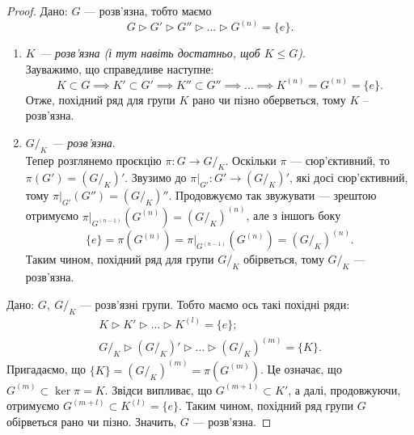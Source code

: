 \documentclass{math_library}
\begin{document}
\begin{proof}
\rightproof Дано: $G$ --- розв'язна, тобто маємо
\[
G \triangleright G' \triangleright G'' \triangleright \dots \triangleright G^{(n)} = \{e\}.
\]
\begin{enumerate}[wide=0pt,label={\Roman*.}]
\item \textit{$K$ --- розв'язна (і тут навіть достатньо, щоб $K \leq G$)}.\\
Зауважимо, що справедливе наступне:
\[
K \subset G \implies K' \subset G' \implies K'' \subset G'' \implies \dots \implies K^{(n)} = G^{(n)} = \{e\}.
\]
Отже, похідний ряд для групи $K$ рано чи пізно оберветься, тому $K$ -- розв'язна.

\item \textit{$G/_K$ --- розв'язна}.\\
Тепер розглянемо проєкцію $\pi \colon G \to G/_K$. Оскільки $\pi$ --- сюр'єктивний, то $\pi(G') = (G/_K)'$. Звузимо до $\pi|_{G'} \colon G' \to (G/_K)'$, які досі сюр'єктивний, тому $\pi|_{G'}(G'') = (G/_K)''$. Продовжуємо так звужувати --- зрештою отримуємо $\pi|_{G^{(n-1)}}(G^{(n)}) = (G/_K)^{(n)}$, але з іншогь боку
\[ 
\{e\} = \pi(G^{(n)}) = \pi|_{G^{(n-1)}}(G^{(n)}) = (G/_K)^{(n)}.
\] 
Таким чином, похідний ряд для групи $G/_K$ обірветься, тому $G/_K$ --- розв'язна.
\end{enumerate}

\leftproof Дано: $G,\ G/_K$ --- розв'язні групи. Тобто маємо ось такі похідні ряди:
\begin{align*}
K \triangleright K' \triangleright \dots \triangleright K^{(l)} = \{e\};\\
G/_K \triangleright (G/_K)' \triangleright \dots \triangleright (G/_K)^{(m)} = \{K\}.
\end{align*}
Пригадаємо, що $\{K\} = (G/_K)^{(m)} = \pi(G^{(m)})$. Це означає, що $G^{(m)} \subset \ker \pi = K$. Звідси випливає, що $G^{(m+1)} \subset K'$, а далі, продовжуючи, отримуємо $G^{(m+l)} \subset K^{(l)} = \{e\}$. Таким чином, похідний ряд групи $G$ обірветься рано чи пізно. Значить, $G$ --- розв'язна.
\end{proof}
\end{document}
